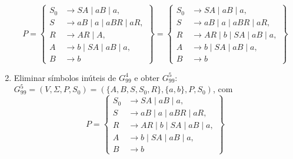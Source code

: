 \documentclass[12pt]{article}
\def\myling{{99}} %
\begin{document}
\begin{tcolorbox}[breakable,rounded corners, colback=yellow!5, colframe=red!40!black, title={Transformações em $G_{\myling}$.}]
\begin{enumerate}
    \[P=\left\{
     \begin{aligned}
      S_0 & \to SA\mid aB\mid a, \\
      S   & \to aB\mid a\mid aBR\mid aR, \\
      R   & \to AR\mid A, \\
      A   & \to b\mid SA\mid aB\mid a, \\
      B   & \to b
     \end{aligned}
    \right\}=
    \left\{
     \begin{aligned}
      S_0 & \to SA\mid aB\mid a, \\
      S   & \to aB\mid a\mid aBR\mid aR, \\
      R   & \to AR\mid b\mid SA\mid aB\mid a, \\
      A   & \to b\mid SA\mid aB\mid a, \\
      B   & \to b
     \end{aligned}
    \right\}\]
  \item Eliminar símbolos inúteis de $G_{\myling}^4$ e obter $G_{\myling}^5$:\\
  $G_{\myling}^5=(V,\Sigma,P,S_0)=(\{A,B,S,S_0,R\},\{a,b\},P,S_0)$, com
    \[P=\left\{
     \begin{aligned}
      S_0 & \to SA\mid aB\mid a, \\
      S   & \to aB\mid a\mid aBR\mid aR, \\
      R   & \to AR\mid b\mid SA\mid aB\mid a, \\
      A   & \to b\mid SA\mid aB\mid a, \\
      B   & \to b
     \end{aligned}
    \right\}\]
\end{enumerate}
\end{tcolorbox}
\end{document}
